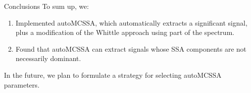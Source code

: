 \documentclass[notheorems, handout]{beamer}
\begin{document}

\begin{frame}{Conclusions}
	To sum up, we:
	\begin{enumerate}
		\item Implemented autoMCSSA, which automatically extracts a significant signal, plus a modification of the Whittle approach using part of the spectrum.\medskip
		\item Found that autoMCSSA can extract signals whose SSA components are not necessarily dominant.\medskip
	\end{enumerate}
	In the future, we plan to formulate a strategy for selecting autoMCSSA parameters.
\end{frame}
\end{document}
